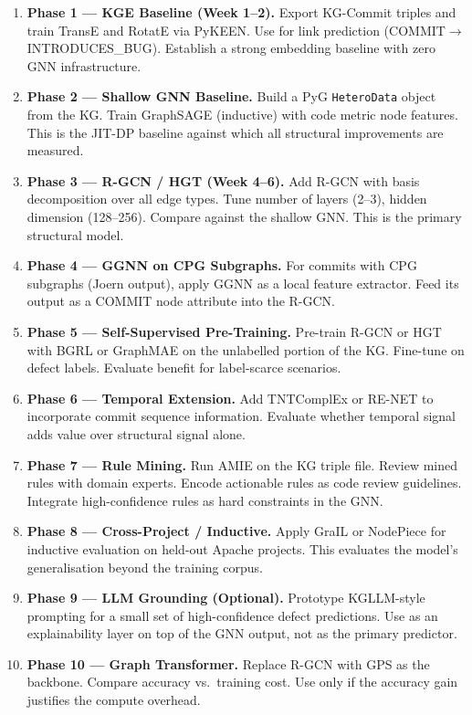 \documentclass[12pt,a4paper]{article}
\begin{document}
\begin{enumerate}[leftmargin=1.5em]
  \item \textbf{Phase 1 --- KGE Baseline (Week 1--2).}
        Export KG-Commit triples and train TransE and RotatE via PyKEEN.
        Use for link prediction (COMMIT$\to$INTRODUCES\_BUG). Establish a
        strong embedding baseline with zero GNN infrastructure.

  \item \textbf{Phase 2 --- Shallow GNN Baseline.}
        Build a PyG \texttt{HeteroData} object from the KG. Train GraphSAGE
        (inductive) with code metric node features. This is the JIT-DP
        baseline against which all structural improvements are measured.

  \item \textbf{Phase 3 --- R-GCN / HGT (Week 4--6).}
        Add R-GCN with basis decomposition over all edge types. Tune number
        of layers (2--3), hidden dimension (128--256). Compare against the
        shallow GNN. This is the primary structural model.

  \item \textbf{Phase 4 --- GGNN on CPG Subgraphs.}
        For commits with CPG subgraphs (Joern output), apply GGNN as a local
        feature extractor. Feed its output as a COMMIT node attribute into
        the R-GCN.

  \item \textbf{Phase 5 --- Self-Supervised Pre-Training.}
        Pre-train R-GCN or HGT with BGRL or GraphMAE on the unlabelled
        portion of the KG. Fine-tune on defect labels. Evaluate benefit for
        label-scarce scenarios.

  \item \textbf{Phase 6 --- Temporal Extension.}
        Add TNTComplEx or RE-NET to incorporate commit sequence information.
        Evaluate whether temporal signal adds value over structural signal
        alone.

  \item \textbf{Phase 7 --- Rule Mining.}
        Run AMIE on the KG triple file. Review mined rules with domain experts.
        Encode actionable rules as code review guidelines. Integrate
        high-confidence rules as hard constraints in the GNN.

  \item \textbf{Phase 8 --- Cross-Project / Inductive.}
        Apply GraIL or NodePiece for inductive evaluation on held-out Apache
        projects. This evaluates the model's generalisation beyond the training
        corpus.

  \item \textbf{Phase 9 --- LLM Grounding (Optional).}
        Prototype KGLLM-style prompting for a small set of high-confidence
        defect predictions. Use as an explainability layer on top of the GNN
        output, not as the primary predictor.

  \item \textbf{Phase 10 --- Graph Transformer.}
        Replace R-GCN with GPS as the backbone. Compare accuracy vs.\ training
        cost. Use only if the accuracy gain justifies the compute overhead.
\end{enumerate}
\end{document}
